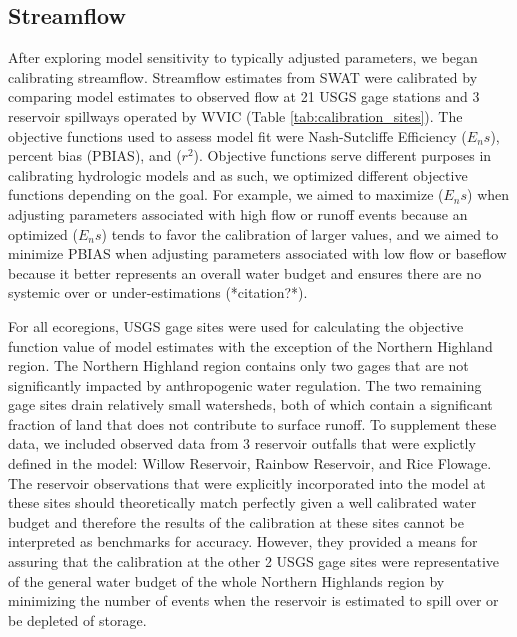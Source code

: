 \subsection{Streamflow}

After exploring model sensitivity to typically adjusted parameters, we began
calibrating streamflow. Streamflow estimates from SWAT were calibrated by
comparing model estimates to observed flow at 21 USGS gage stations and 3 reservoir spillways operated by WVIC (Table \ref{tab:calibration_sites}). The
objective functions used to assess model fit were Nash-Sutcliffe Efficiency
(\(E_ns\)), percent bias (PBIAS), and (\(r^2\)). Objective functions serve
different purposes in calibrating hydrologic models and as such, we optimized
different objective functions depending on the goal. For example, we aimed to
maximize (\(E_ns\)) when adjusting parameters associated with high flow or
runoff events because an optimized (\(E_ns\)) tends to favor the calibration of
larger values, and we aimed to minimize PBIAS when adjusting
parameters associated with low flow or baseflow because it better represents an overall
water budget and ensures there are no systemic over or under-estimations
(*citation?*).



For all ecoregions, USGS gage sites were used for calculating the objective
function value of model estimates with the exception of the Northern Highland
region. The Northern Highland region contains only two gages that are not
significantly impacted by anthropogenic water regulation. The two remaining gage
sites drain relatively small watersheds, both of which contain a significant
fraction of land that does not contribute to surface runoff. To supplement these
data, we included observed data from 3 reservoir outfalls that were explictly
defined in the model: Willow Reservoir, Rainbow Reservoir, and Rice Flowage. The
reservoir observations that were explicitly incorporated into the model at these
sites should theoretically match perfectly given a well calibrated water budget
and therefore the results of the calibration at these sites cannot be
interpreted as benchmarks for accuracy. However, they provided a means for
assuring that the calibration at the other 2 USGS gage sites were representative
of the general water budget of the whole Northern Highlands region by minimizing
the number of events when the reservoir is estimated to spill over or be
depleted of storage.

